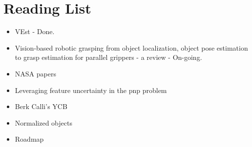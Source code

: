 \documentclass[11pt]{article}
\begin{document}
\section{Reading List}
\begin{itemize}
      \item VEst \cite{dani2009position} - Done.
      \item Vision-based robotic grasping from object localization, object pose estimation to grasp estimation for parallel grippers - a review \cite{du2020vision} - On-going.
      \item NASA papers \cite{NASATech44:online}
      \item Leveraging feature uncertainty in the pnp problem \cite{ferraz2014leveraging}
      \item Berk Calli's YCB \cite{calli2015ycb}
      \item Normalized objects \cite{Wang_2019_CVPR}
      \item Roadmap \cite{roadmap251:online}
\end{itemize}
\end{document}

